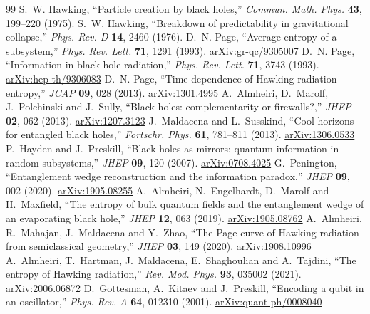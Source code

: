 \documentclass[11pt,a4paper]{article}
\begin{document}
\begin{thebibliography}{99}\small
\setlength{\itemsep}{0.25ex}
 S.~W. Hawking, ``Particle creation by black holes,'' \emph{Commun. Math. Phys.} \textbf{43}, 199--220 (1975). 
 S.~W. Hawking, ``Breakdown of predictability in gravitational collapse,'' \emph{Phys. Rev. D} \textbf{14}, 2460 (1976). 
 D.~N. Page, ``Average entropy of a subsystem,'' \emph{Phys. Rev. Lett.} \textbf{71}, 1291 (1993). \href{https://arxiv.org/abs/gr-qc/9305007}{arXiv:gr-qc/9305007}
 D.~N. Page, ``Information in black hole radiation,'' \emph{Phys. Rev. Lett.} \textbf{71}, 3743 (1993). \href{https://arxiv.org/abs/hep-th/9306083}{arXiv:hep-th/9306083}
 D.~N. Page, ``Time dependence of Hawking radiation entropy,'' \emph{JCAP} \textbf{09}, 028 (2013). \href{https://arxiv.org/abs/1301.4995}{arXiv:1301.4995}
 A.~Almheiri, D.~Marolf, J.~Polchinski and J.~Sully, ``Black holes: complementarity or firewalls?,'' \emph{JHEP} \textbf{02}, 062 (2013). \href{https://arxiv.org/abs/1207.3123}{arXiv:1207.3123}
 J.~Maldacena and L.~Susskind, ``Cool horizons for entangled black holes,'' \emph{Fortschr. Phys.} \textbf{61}, 781--811 (2013). \href{https://arxiv.org/abs/1306.0533}{arXiv:1306.0533}
 P.~Hayden and J.~Preskill, ``Black holes as mirrors: quantum information in random subsystems,'' \emph{JHEP} \textbf{09}, 120 (2007). \href{https://arxiv.org/abs/0708.4025}{arXiv:0708.4025}
 G.~Penington, ``Entanglement wedge reconstruction and the information paradox,'' \emph{JHEP} \textbf{09}, 002 (2020). \href{https://arxiv.org/abs/1905.08255}{arXiv:1905.08255}
 A.~Almheiri, N.~Engelhardt, D.~Marolf and H.~Maxfield, ``The entropy of bulk quantum fields and the entanglement wedge of an evaporating black hole,'' \emph{JHEP} \textbf{12}, 063 (2019). \href{https://arxiv.org/abs/1905.08762}{arXiv:1905.08762}
 A.~Almheiri, R.~Mahajan, J.~Maldacena and Y.~Zhao, ``The Page curve of Hawking radiation from semiclassical geometry,'' \emph{JHEP} \textbf{03}, 149 (2020). \href{https://arxiv.org/abs/1908.10996}{arXiv:1908.10996}
 A.~Almheiri, T.~Hartman, J.~Maldacena, E.~Shaghoulian and A.~Tajdini, ``The entropy of Hawking radiation,'' \emph{Rev. Mod. Phys.} \textbf{93}, 035002 (2021). \href{https://arxiv.org/abs/2006.06872}{arXiv:2006.06872}
 D.~Gottesman, A.~Kitaev and J.~Preskill, ``Encoding a qubit in an oscillator,'' \emph{Phys. Rev. A} \textbf{64}, 012310 (2001). \href{https://arxiv.org/abs/quant-ph/0008040}{arXiv:quant-ph/0008040}

\end{thebibliography}
\end{document}
